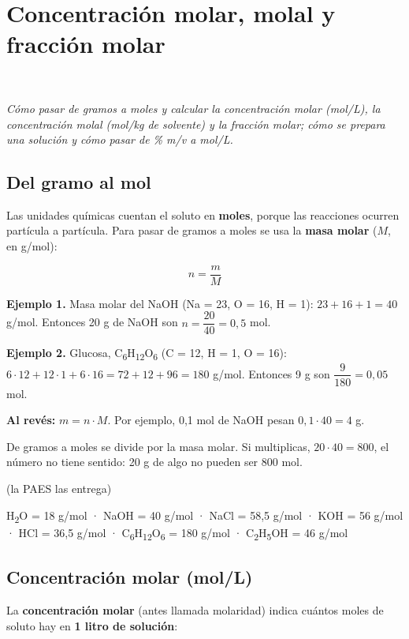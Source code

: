 \section[Concentración molar, molal y fracción molar]{Concentración molar, molal y fracción molar}
\modcomun\ \ {\color{gris}\itshape Cómo pasar de gramos a moles y calcular la concentración molar (mol/L), la concentración molal (mol/kg de solvente) y la fracción molar; cómo se prepara una solución y cómo pasar de \% m/v a mol/L.\par}
\subsection{Del gramo al mol}
Las unidades químicas cuentan el soluto en \textbf{moles}, porque las reacciones ocurren partícula a partícula. Para pasar de gramos a moles se usa la \textbf{masa molar} ($M$, en g/mol):

 \[ n = \dfrac{m}{M} \] 

\textbf{Ejemplo 1.} Masa molar del NaOH (Na = 23, O = 16, H = 1): $23 + 16 + 1 = 40$ g/mol. Entonces 20 g de NaOH son $n = \dfrac{20}{40} = 0{,}5$ mol.

 

\textbf{Ejemplo 2.} Glucosa, C\textsubscript{6}H\textsubscript{12}O\textsubscript{6} (C = 12, H = 1, O = 16): $6\cdot 12 + 12\cdot 1 + 6\cdot 16 = 72 + 12 + 96 = 180$ g/mol. Entonces 9 g son $\dfrac{9}{180} = 0{,}05$ mol.

 

\textbf{Al revés:} $m = n \cdot M$. Por ejemplo, 0,1 mol de NaOH pesan $0{,}1 \cdot 40 = 4$ g.

  
\begin{ojo} De gramos a moles se divide por la masa molar. Si multiplicas, $20 \cdot 40 = 800$, el número no tiene sentido: 20 g de algo no pueden ser 800 mol.\end{ojo}
 
\begin{clave} (la PAES las entrega)\par H\textsubscript{2}O = 18 g/mol · NaOH = 40 g/mol · NaCl = 58,5 g/mol · KOH = 56 g/mol · HCl = 36,5 g/mol · C\textsubscript{6}H\textsubscript{12}O\textsubscript{6} = 180 g/mol · C\textsubscript{2}H\textsubscript{5}OH = 46 g/mol\end{clave}
\subsection{Concentración molar (mol/L)}
La \textbf{concentración molar} (antes llamada molaridad) indica cuántos moles de soluto hay en \textbf{1 litro de solución}:

